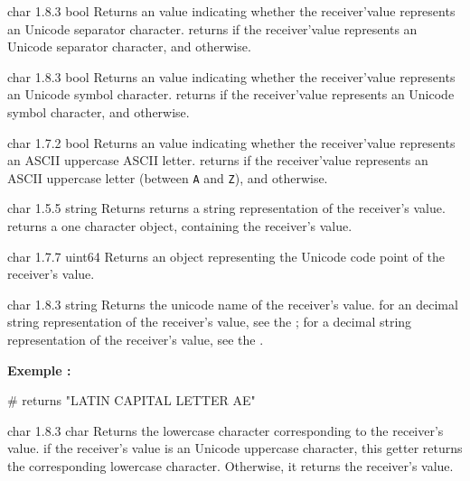 {char}
{1.8.3}
{bool}
{Returns an  value indicating whether the receiver'value represents an Unicode separator character.}
{returns  if the receiver'value represents an Unicode separator character, and  otherwise.}






{char}
{1.8.3}
{bool}
{Returns an  value indicating whether the receiver'value represents an Unicode symbol character.}
{returns  if the receiver'value represents an Unicode symbol character, and  otherwise.}









{char}
{1.7.2}
{bool}
{Returns an  value indicating whether the receiver'value represents an ASCII uppercase ASCII letter.}
{returns  if the receiver'value represents an ASCII uppercase letter (between \texttt{\textquotesingle A\textquotesingle} and \texttt{\textquotesingle Z\textquotesingle}), and  otherwise.}





{char}
{1.5.5}
{string}
{Returns returns a string representation of the receiver's value.}
{returns a one character  object, containing the receiver's value.}




{char}
{1.7.7}
{uint64}
{Returns an  object representing the Unicode code point of the receiver's value.}
{}




{char}
{1.8.3}
{string}
{Returns the unicode name of the receiver's value.}
{for an decimal string representation of the receiver's value, see the ; for a decimal string representation of the receiver's value, see the .}

\textbf{Exemple :}
\begin{galgascode}
['\AE' unicodeName] # returns "LATIN CAPITAL LETTER AE"
\end{galgascode}




{char}
{1.8.3}
{char}
{Returns the lowercase character corresponding to the receiver's value.}
{if the receiver's value is an Unicode uppercase character, this getter returns the corresponding lowercase character. Otherwise, it returns the receiver's value.}

